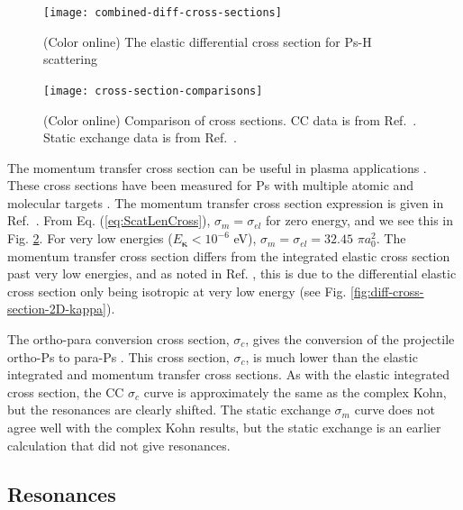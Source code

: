 \documentclass[preprint,showpacs,showkeys,preprintnumbers,amsmath,amssymb,longbibliography,pra,aps]{revtex4-1}
\begin{document}
\begin{figure}[H]
	\centering
	\texttt{[image: combined-diff-cross-sections]}
	\caption{(Color online) The elastic differential cross section for Ps-H
scattering}
	\label{fig:combined-diff-cross-sections}
\end{figure}

\begin{figure}[H]
	\centering
	\texttt{[image: cross-section-comparisons]}
	\caption{(Color online) Comparison of cross sections. CC data is from
Ref.~\cite{Blackwood2002}. Static exchange data is from Ref.~\cite{Hara1975}.}
	\label{fig:cross-section-comparisons}
\end{figure}

The momentum transfer cross section can be useful in plasma applications
\cite{Wang2014, McEachran2014}. These cross sections have been measured for Ps
with multiple atomic and molecular targets \cite{Nagashima1998,Saito2003}. The
momentum transfer cross section expression is given in Ref.~\cite{Bransden2003}.
From Eq. (\ref{eq:ScatLenCross}), $\sigma_m = \sigma_{el}$ for zero energy, 
and we see this in Fig. \ref{fig:cross-section-comparisons}. For very low 
energies ($E_{\bm \kappa} < 10^{-6}$ eV),
$\sigma_m = \sigma_{el} = 32.45$ $\pi a_0^2$.
The momentum transfer cross section differs from the integrated elastic cross
section past very low energies, and as 
noted in Ref. \cite{Blackwood2002c}, this is due to the differential elastic 
cross section only being isotropic at very low energy
(see Fig. \ref{fig:diff-cross-section-2D-kappa}).

The ortho-para conversion cross section, $\sigma_c$, gives the conversion
of the projectile ortho-Ps to para-Ps \cite{Hara1975}.
This cross section, $\sigma_c$, is much lower than the elastic integrated and
momentum transfer cross sections. As with the elastic integrated cross
section, the CC $\sigma_c$ curve \cite{Blackwood2002} is approximately the
same as the complex Kohn, but the resonances are clearly shifted. The static
exchange $\sigma_m$ curve \cite{Hara1975} does not agree well with the
complex Kohn results, but the static exchange is an earlier calculation 
that did not give resonances.

\subsection{Resonances}
\label{sec:Resonances}
\end{document}
